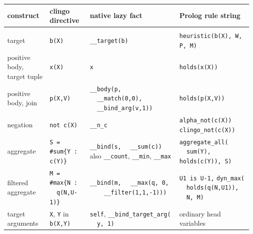\begin{table}[H]
\centering
\footnotesize
\setlength{\tabcolsep}{4pt}
\renewcommand{\arraystretch}{1.15}
\begin{tabular}{@{}>{\raggedright\arraybackslash}p{2.1cm}>{\raggedright\arraybackslash}p{3.3cm}>{\raggedright\arraybackslash}p{3.9cm}>{\raggedright\arraybackslash}p{3.9cm}@{}}
\toprule
\textbf{construct} & \textbf{clingo directive} & \textbf{native lazy fact} & \textbf{Prolog rule string}\\
\midrule
\multicolumn{4}{@{}l}{\emph{structure}}\\
\addlinespace[2pt]
target & \texttt{b(X)} & \texttt{\_\_target(b)} & \texttt{heuristic(b(X), W, P, M)}\\
\addlinespace[3pt]
positive body, target tuple & \texttt{x(X)} & \texttt{x} & \texttt{holds(x(X))}\\
\addlinespace[3pt]
positive body, join & \texttt{p(X,V)} & \texttt{\_\_body(p,} \newline \texttt{\ \ \_\_match(0,0),} \newline \texttt{\ \ \_\_bind\_arg(v,1))} & \texttt{holds(p(X,V))}\\
\addlinespace[3pt]
negation & \texttt{not c(X)} & \texttt{\_\_n\_c} & \texttt{alpha\_not(c(X))} \newline \texttt{clingo\_not(c(X))}\\
\addlinespace[3pt]
aggregate & \texttt{S = \#sum\{Y : c(Y)\}} & \texttt{\_\_bind(s,} \newline \texttt{\ \ \_\_sum(c))} \newline also \texttt{\_\_count}, \texttt{\_\_min}, \texttt{\_\_max} & \texttt{aggregate\_all(} \newline \texttt{\ \ sum(Y), holds(c(Y)), S)}\\
\addlinespace[3pt]
filtered aggregate & \texttt{M = \#max\{N :} \newline \texttt{\ \ q(N,U-1)\}} & \texttt{\_\_bind(m,} \newline \texttt{\ \ \_\_max(q, 0,} \newline \texttt{\ \ \ \ \_\_filter(1,1,-1)))} & \texttt{U1 is U-1,} \newline \texttt{dyn\_max(} \newline \texttt{\ \ holds(q(N,U1)),} \newline \texttt{\ \ N, M)}\\
\addlinespace[3pt]
target arguments & \texttt{X}, \texttt{Y} in \texttt{b(X,Y)} & \texttt{self}, \newline \texttt{\_\_bind\_target\_arg(} \newline \texttt{\ \ y, 1)} & ordinary head variables\\

\end{tabular}
\end{table}
